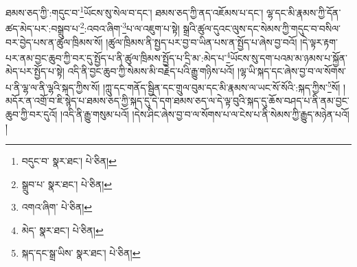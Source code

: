 ཐམས་ཅད་ཀྱི་:གདུང་བ་\footnote{བདུང་བ་  སྣར་ཐང་།  པེ་ཅིན། }ཡོངས་སུ་སེལ་བ་དང་། ཐམས་ཅད་ཀྱི་ནད་འཇོམས་པ་དང་། ལྷ་དང་མི་རྣམས་ཀྱི་དོན་ཚད་མེད་པར་:བསྒྲུབ་པ་\footnote{སྒྲུབ་པ་  སྣར་ཐང་།  པེ་ཅིན། }:འབའ་ཞིག་\footnote{འགའ་ཞིག་  པེ་ཅིན། }པ་ལ་འཇུག་པ་སྟེ། སྒྲའི་ཚུལ་དུའང་ལུས་དང་སེམས་ཀྱི་གདུང་བ་བསིལ་བར་བྱེད་པས་ན་ཚུལ་ཁྲིམས་སོ། །ཚུལ་ཁྲིམས་ནི་སྤྱད་པར་བྱ་བ་ཡིན་པས་ན་སྤྱོད་པ་ཞེས་བྱ་བའོ། །དེ་ལྟར་རྟག་པར་ནམ་བྱང་ཆུབ་ཀྱི་བར་དུ་སྤྱོད་པ་ནི་ཚུལ་ཁྲིམས་སྤྱོད་པ་དྲི་མ་:མེད་པ་\footnote{མེད་  སྣར་ཐང་།  པེ་ཅིན། }ཡོངས་སུ་དག་པའམ་མ་ཉམས་པ་སྐྱོན་མེད་པར་སྤྱོད་པ་སྟེ། འདི་ནི་བྱང་ཆུབ་ཀྱི་སེམས་མི་བརྗེད་པའི་རྒྱུ་གཉིས་པའོ། །ལྷ་ཡི་སྐད་དང་ཞེས་བྱ་བ་ལ་སོགས་པ་ནི་ལྷ་ལ་ནི་ལྷའི་སྐད་ཀྱིས་སོ། །ཀླུ་དང་གནོད་སྦྱིན་དང་གྲུལ་བུམ་དང་མི་རྣམས་ལ་ཡང་སོ་སོའི་:སྐད་ཀྱིས་\footnote{སྐད་དང་སྒྲ་ཡིས་  སྣར་ཐང་།  པེ་ཅིན། }སོ། །མདོར་ན་འགྲོ་བ་ཇི་སྙེད་པ་ཐམས་ཅད་ཀྱི་སྐད་དུ་དེ་དག་ཐམས་ཅད་ལ་དེ་ལྟ་བུའི་སྐད་དུ་ཆོས་བཤད་པ་ནི་ནམ་བྱང་ཆུབ་ཀྱི་བར་དུའོ། །འདི་ནི་རྒྱུ་གསུམ་པའོ། །དེས་ཤིང་ཞེས་བྱ་བ་ལ་སོགས་པ་ལ་ངེས་པ་ནི་སེམས་ཀྱི་རྒྱུད་མཉེན་པའོ། །
